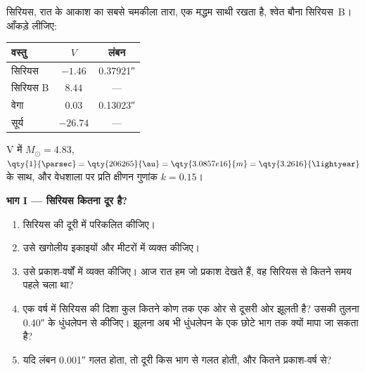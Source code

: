 \begin{problem}
\label{pb:b1:observing-the-sky:1}
सिरियस, रात के आकाश का सबसे चमकीला तारा, एक मद्धम साथी रखता है, श्वेत बौना सिरियस~B। आँकड़े लीजिए:
\begin{center}
\small
\begin{tabular}{lcc}
\hline
वस्तु & $V$ & लंबन \\
\hline
सिरियस & $-1.46$ & \ang{;;0.37921} \\
सिरियस B & $8.44$ & --- \\
वेगा & $0.03$ & \ang{;;0.13023} \\
सूर्य & $-26.74$ & --- \\
\hline
\end{tabular}
\end{center}
V में $M_\odot = 4.83$, $\qty{1}{\parsec} = \qty{206265}{\au} =
\qty{3.0857e16}{m} = \qty{3.2616}{\lightyear}$ के साथ, और वेधशाला पर प्रति  क्षीणन गुणांक
$k = 0.15$।

\medskip
\noindent\textbf{भाग I --- सिरियस कितना दूर है?}
\begin{enumerate}
  \item सिरियस की दूरी  में परिकलित कीजिए।
  \item उसे खगोलीय इकाइयों और मीटरों में व्यक्त कीजिए।
  \item उसे प्रकाश-वर्षों में व्यक्त कीजिए। आज रात हम जो प्रकाश देखते हैं, वह सिरियस से कितने समय पहले चला था?
  \item एक वर्ष में सिरियस की दिशा कुल कितने कोण तक एक ओर से दूसरी ओर झूलती है? उसकी तुलना \ang{;;0.40} के धुंधलेपन से कीजिए। झूलना अब भी धुंधलेपन के एक छोटे भाग तक क्यों मापा जा सकता है?
  \item यदि लंबन \ang{;;0.001} गलत होता, तो दूरी किस भाग से गलत होती, और कितने प्रकाश-वर्ष से?
\end{enumerate}


\end{problem}
